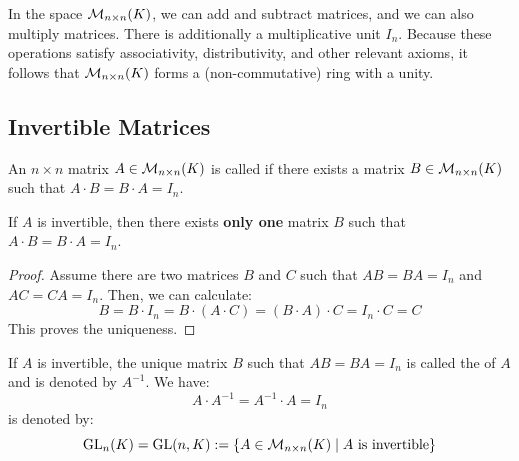 \begin{remark}
In the space $\mathcal{M}_{n \times n}(K)$, we can add and subtract matrices, and we can also multiply matrices. There is additionally a multiplicative unit $I_n$. Because these operations satisfy associativity, distributivity, and other relevant axioms, it follows that $\mathcal{M}_{n \times n}(K)$ forms a (non-commutative) ring with a unity.
\end{remark}

\subsection{Invertible Matrices}

\begin{definition}[Invertibility]
An $n \times n$ matrix $A \in \mathcal{M}_{n \times n}(K)$ is called  if there exists a matrix $B \in \mathcal{M}_{n \times n}(K)$ such that $A \cdot B = B \cdot A = I_n$.
\end{definition}

\begin{remark}
If $A$ is invertible, then there exists \textbf{only one} matrix $B$ such that $A \cdot B = B \cdot A = I_n$.
\end{remark}

\begin{proof}
Assume there are two matrices $B$ and $C$ such that $AB = BA = I_n$ and $AC = CA = I_n$. Then, we can calculate:
\begin{equation*}
    B = B \cdot I_n = B \cdot (A \cdot C) = (B \cdot A) \cdot C = I_n \cdot C = C
\end{equation*}
This proves the uniqueness.
\end{proof}

\begin{definition}
If $A$ is invertible, the unique matrix $B$ such that $AB = BA = I_n$ is called the  of $A$ and is denoted by $A^{-1}$. We have:
\begin{equation*}
    A \cdot A^{-1} = A^{-1} \cdot A = I_n
\end{equation*}
 is denoted by:
\begin{equation*}
    \operatorname{GL}_n(K) = \operatorname{GL}(n, K) := \{A \in \mathcal{M}_{n \times n}(K) \mid A \text{ is invertible}\}
\end{equation*}
\end{definition}

